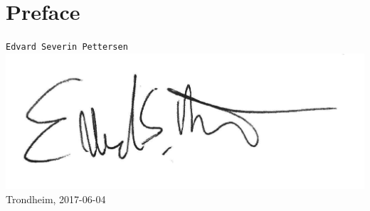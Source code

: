 
\newpage
{}
\section*{Preface}


\begin{flushright}
\texttt{Edvard Severin Pettersen}\\
\includegraphics[width=0.3\linewidth,right]{fig/signature}
Trondheim, 2017-06-04
\end{flushright}

\afterpage{\blankpage}
